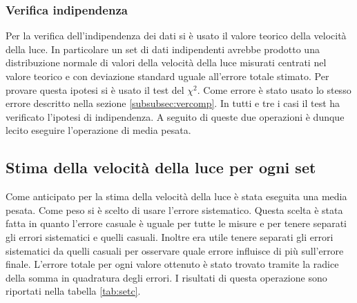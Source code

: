 \documentclass[a4paper,11pt]{article}
\begin{document}
	\subsubsection{Verifica indipendenza}
	Per la verifica dell'indipendenza dei dati si è usato il valore teorico della velocità della luce. In particolare un set di dati indipendenti avrebbe prodotto una distribuzione normale di valori della velocità della luce misurati centrati nel valore teorico e con deviazione standard uguale all'errore totale stimato. Per provare questa ipotesi si è usato il test del $ \chi^2 $. Come errore è stato usato lo stesso errore descritto nella sezione \ref{subsubsec:vercomp}. In tutti e tre i casi il test ha verificato l'ipotesi di indipendenza. A seguito di queste due operazioni è dunque lecito eseguire l'operazione di media pesata.
	\subsection{Stima della velocità della luce per ogni set}
	Come anticipato per la stima della velocità della luce è stata eseguita una media pesata. Come peso si è scelto di usare l'errore sistematico. Questa scelta è stata fatta in quanto l'errore casuale è uguale per tutte le misure e per tenere separati gli errori sistematici e quelli casuali. Inoltre era utile tenere separati gli errori sistematici da quelli casuali per osservare quale errore influisce di più sull'errore finale. L'errore totale per ogni valore ottenuto è stato trovato tramite la radice della somma in quadratura degli errori. I risultati di questa operazione sono riportati nella tabella \ref{tab:setc}.
\end{document}
